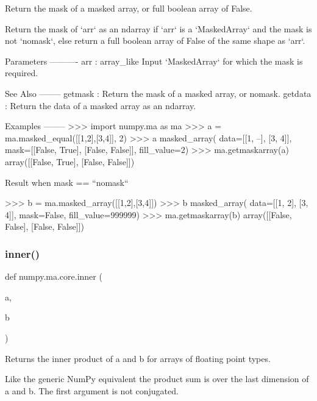 \begin{DoxyVerb}Return the mask of a masked array, or full boolean array of False.

Return the mask of `arr` as an ndarray if `arr` is a `MaskedArray` and
the mask is not `nomask`, else return a full boolean array of False of
the same shape as `arr`.

Parameters
----------
arr : array_like
    Input `MaskedArray` for which the mask is required.

See Also
--------
getmask : Return the mask of a masked array, or nomask.
getdata : Return the data of a masked array as an ndarray.

Examples
--------
>>> import numpy.ma as ma
>>> a = ma.masked_equal([[1,2],[3,4]], 2)
>>> a
masked_array(
  data=[[1, --],
        [3, 4]],
  mask=[[False,  True],
        [False, False]],
  fill_value=2)
>>> ma.getmaskarray(a)
array([[False,  True],
       [False, False]])

Result when mask == ``nomask``

>>> b = ma.masked_array([[1,2],[3,4]])
>>> b
masked_array(
  data=[[1, 2],
        [3, 4]],
  mask=False,
  fill_value=999999)
>>> ma.getmaskarray(b)
array([[False, False],
       [False, False]])\end{DoxyVerb}
 \mbox{\label{namespacenumpy_1_1ma_1_1core_a68e9672d8feb596be0480ed2c506a7f3}} 
\subsubsection{\texorpdfstring{inner()}{inner()}}
{\footnotesize\ttfamily def numpy.\+ma.\+core.\+inner (\begin{DoxyParamCaption}\item[{}]{a,  }\item[{}]{b }\end{DoxyParamCaption})}

\begin{DoxyVerb}Returns the inner product of a and b for arrays of floating point types.

Like the generic NumPy equivalent the product sum is over the last dimension
of a and b. The first argument is not conjugated.\end{DoxyVerb}
 \mbox{\label{namespacenumpy_1_1ma_1_1core_a65e12c5ad1e1b9c898fafcc88a25c597}} 
